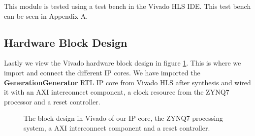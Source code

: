 This module is tested using a test bench in the Vivado HLS IDE. This test bench can be seen in Appendix A.

\subsection{Hardware Block Design}

Lastly we view the Vivado hardware block design in figure \ref{fig:vivadodesign}. This is where we import and connect the different IP cores.
We have imported the \textbf{GenerationGenerator} RTL IP core from Vivado HLS after synthesis and wired it with an AXI interconnect component, a clock resource from the ZYNQ7 processor and a reset controller.

\begin{figure}[h!]
	\centering
	\caption{The block design in Vivado of our IP core, the ZYNQ7 processing system, a AXI interconnect component and a reset controller.}
	\label{fig:vivadodesign}
\end{figure}
